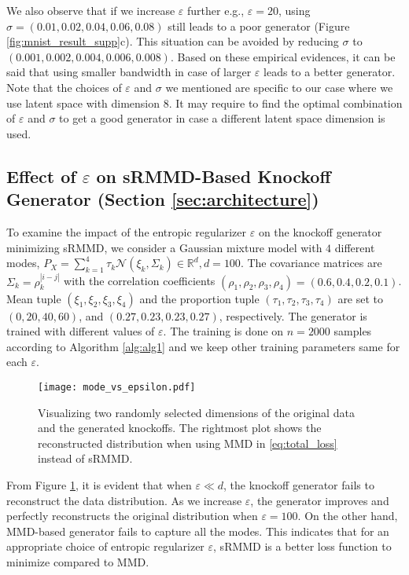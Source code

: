 \documentclass{article}
\theoremstyle{definition}
\begin{document}
We also observe that if we increase $\varepsilon$ further e.g., $\varepsilon=20$, using $\sigma =(0.01, 0.02, 0.04, 0.06, 0.08)$ still leads to a poor generator (Figure \ref{fig:mnist_result_supp}c). This situation can be avoided by reducing $\sigma$ to $(0.001, 0.002, 0.004, 0.006, 0.008)$. Based on these empirical evidences, it can be said that using smaller bandwidth in case of larger $\varepsilon$ leads to a better generator. Note that the choices of $\varepsilon$ and $\sigma$ we mentioned are specific to our case where we use latent space with dimension $8$. It may require to find the optimal combination of $\varepsilon$ and $\sigma$ to get a good generator in case a different latent space dimension is used.

\subsection{Effect of \texorpdfstring{$\varepsilon$}{epsilon} on sRMMD-Based Knockoff Generator (Section \ref{sec:architecture})}
\label{supp:srmmd_w.r.t.epsilon}
To examine the impact of the entropic regularizer $\varepsilon$ on the knockoff generator minimizing sRMMD, we consider a Gaussian mixture model with $4$ different modes, $P_X= \sum_{k=1}^4 \tau_k \mathcal N(\xi_k, \Sigma_k)\in \mathbb R^d, d=100$. The covariance matrices are $\Sigma_k = \rho_k^{|i-j|}$ with the correlation coefficients $(\rho_1, \rho_2, \rho_3, \rho_4)= (0.6, 0.4, 0.2, 0.1)$. Mean tuple $(\xi_1, \xi_2, \xi_3, \xi_4)$ and the proportion tuple  $(\tau_1, \tau_2, \tau_3, \tau_4)$ are set to $(0, 20, 40, 60)$, and $(0.27, 0.23, 0.23, 0.27)$, respectively. The generator is trained with different values of $\varepsilon$. The training is done on $n=2000$ samples according to Algorithm \ref{alg:alg1} and we keep other training parameters same for each $\varepsilon$.
\begin{figure}[H]
    \centering
    \texttt{[image: mode\_vs\_epsilon.pdf]}\\
    \caption{Visualizing two randomly selected dimensions of the original data and the generated knockoffs. The rightmost plot shows the reconstructed distribution when using MMD in \eqref{eq:total_loss} instead of sRMMD.}
    \label{fig:epsilon_check}
    \vspace{-4mm}
\end{figure}
From Figure \ref{fig:epsilon_check}, it is evident that when $\varepsilon \ll d$, the knockoff generator fails to reconstruct the data distribution. As we increase $\varepsilon$, the generator improves and perfectly reconstructs the original distribution when $\varepsilon = 100$. On the other hand, MMD-based generator fails to capture all the modes. This indicates that for an appropriate choice of entropic regularizer $\varepsilon$, sRMMD is a better loss function to minimize compared to MMD. 
\end{document}
